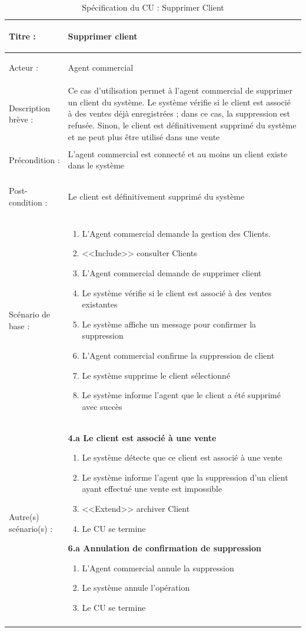 \begin{longtable}{|>{\bfseries\raggedright\arraybackslash}p{3.5cm}|p{\dimexpr\textwidth-3.5cm-4\tabcolsep-2\arrayrulewidth}|}
\hline
Titre : & Supprimer client \\
\hline
Acteur : & Agent commercial \\
\hline
Description brève : & Ce cas d'utilisation permet à l'agent commercial de supprimer un client du système. Le système vérifie si le client est associé à des ventes déjà enregistrées ; dans ce cas, la suppression est refusée. Sinon, le client est définitivement supprimé du système et ne peut plus être utilisé dans une vente \\
\hline
Précondition : & L'agent commercial est connecté et au moins un client existe dans le système \\
\hline
Post-condition : & Le client est définitivement supprimé du système \\
\hline
Scénario de base : &
\begin{enumerate}[leftmargin=1.5em, topsep=2pt, itemsep=1pt]
  \item L'Agent commercial demande la gestion des Clients.
  \item <<Include>> consulter Clients
  \item L'Agent commercial demande de supprimer client
  \item Le système vérifie si le client est associé à des ventes existantes
  \item Le système affiche un message pour confirmer la suppression
  \item L'Agent commercial confirme la suppression de client
  \item Le système supprime le client sélectionné
  \item Le système informe l'agent que le client a été supprimé avec succès
\end{enumerate} \\
\hline
Autre(s) scénario(s) : &
\textbf{4.a Le client est associé à une vente}
\begin{enumerate}[leftmargin=1.5em, topsep=2pt, itemsep=1pt]
  \item Le système détecte que ce client est associé à une vente
  \item Le système informe l'agent que la suppression d'un client ayant effectué une vente est impossible
  \item <<Extend>> archiver Client
  \item Le CU se termine
\end{enumerate}
\textbf{6.a Annulation de confirmation de suppression}
\begin{enumerate}[leftmargin=1.5em, topsep=2pt, itemsep=1pt]
  \item L'Agent commercial annule la suppression
  \item Le système annule l'opération
  \item Le CU se termine
\end{enumerate} \\
\hline
\caption{Spécification du CU : Supprimer Client}
\label{tab:cu-supprimer-client}
\end{longtable}

